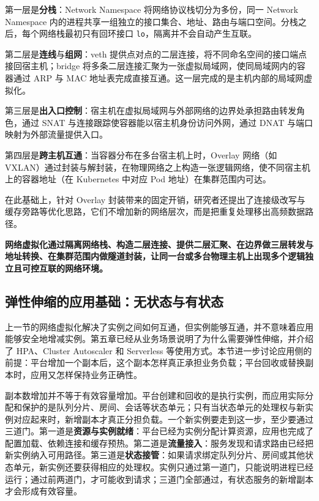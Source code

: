 第一层是\textbf{分栈}：Network Namespace 将网络协议栈切分为多份，同一 Network Namespace 内的进程共享一组独立的接口集合、地址、路由与端口空间。分栈之后，每个网络栈最初只有回环接口 \texttt{lo}，隔离并不会自动产生互联。

第二层是\textbf{连线}与\textbf{组网}：veth 提供点对点的二层连接，将不同命名空间的接口端点接回宿主机；bridge 将多条二层连接汇聚为一张虚拟局域网，使同局域网内的容器通过 ARP 与 MAC 地址表完成直接互通。这一层完成的是主机内部的局域网虚拟化。

第三层是\textbf{出入口控制}：宿主机在虚拟局域网与外部网络的边界处承担路由转发角色，通过 SNAT 与连接跟踪使容器能以宿主机身份访问外网，通过 DNAT 与端口映射为外部流量提供入口。

第四层是\textbf{跨主机互通}：当容器分布在多台宿主机上时，Overlay 网络（如 VXLAN）通过封装与解封装，在物理网络之上构造一张逻辑网络，使不同宿主机上的容器地址（在 Kubernetes 中对应 Pod 地址）在集群范围内可达。

在此基础上，针对 Overlay 封装带来的固定开销，研究者还提出了连接级改写与缓存旁路等优化思路，它们不增加新的网络层次，而是把重复处理移出高频数据路径。

\textbf{网络虚拟化通过隔离网络栈、构造二层连接、提供二层汇聚、在边界做三层转发与地址转换、在集群范围内做隧道封装，让同一台或多台物理主机上出现多个逻辑独立且可控互联的网络环境。}

\subsection{弹性伸缩的应用基础：无状态与有状态}
\label{sec6:elastic-scaling}

上一节的网络虚拟化解决了实例之间如何互通，但实例能够互通，并不意味着应用能够安全地增减实例。第五章已经从业务场景说明了为什么需要弹性伸缩，并介绍了 HPA、Cluster Autoscaler 和 Serverless 等使用方式。本节进一步讨论应用侧的前提：平台增加一个副本后，这个副本怎样真正承担业务负载；平台回收或替换副本时，应用又怎样保持业务正确性。

副本数增加并不等于有效容量增加。平台创建和回收的是执行实例，而应用实际分配和保护的是队列分片、房间、会话等状态单元；只有当状态单元的处理权与新实例对应起来时，新增副本才真正分担负载。一个新实例要走到这一步，至少要通过三道门。第一道是\textbf{资源与实例就绪}：平台已经为实例分配计算资源，应用也完成了配置加载、依赖连接和缓存预热。第二道是\textbf{流量接入}：服务发现和请求路由已经把新实例纳入可用路径。第三道是\textbf{状态接管}：如果请求绑定队列分片、房间或其他状态单元，新实例还要获得相应的处理权。实例只通过第一道门，只能说明进程已经运行；通过前两道门，才可能收到请求；三道门全部通过，有状态服务的新增副本才会形成有效容量。

